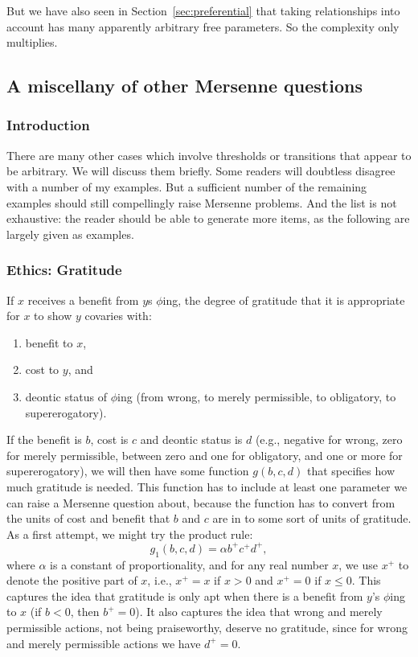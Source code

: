But we have also seen in Section~\ref{sec:preferential} that taking relationships into account has many apparently arbitrary free parameters. So 
the complexity only multiplies.


\subsection{A miscellany of other Mersenne questions}
\subsubsection{Introduction}
There are many other cases which involve thresholds or transitions that appear to be arbitrary. We will discuss them briefly.
Some readers will doubtless disagree with a number of my examples. But a sufficient number of the remaining examples 
should still compellingly raise Mersenne problems. And the list is not
exhaustive: the reader should be able to generate more items, as the following are largely given as examples.

\subsubsection{Ethics: Gratitude}
If $x$ receives a benefit from $y$s $\phi$ing, the degree of gratitude that it is
appropriate for $x$ to show $y$ covaries with:
\begin{enumerate}
\item[(i)] benefit to $x$,
\item[(ii)] cost to $y$, and
\item[(iii)] deontic status of $\phi$ing (from wrong, to merely permissible, to obligatory, to supererogatory).
\end{enumerate}

If the benefit is $b$, cost is $c$ and deontic status is $d$ (e.g., negative for wrong, zero for merely
permissible, between zero and one for obligatory, and one or more for supererogatory), we will then have 
some function $g(b,c,d)$ that specifies how much gratitude is needed. This function has to include at least
one parameter we can raise a Mersenne question about, because the function has to convert from the units
of cost and benefit that $b$ and $c$ are in to some sort of units of gratitude. As a first
attempt, we might try the product rule:
$$
	g_1(b,c,d)=\alpha b^+ c^+ d^+,
$$	
where $\alpha$ is a constant of proportionality, and for any real
number $x$, we use $x^+$ to denote the positive part of $x$, i.e., $x^+=x$ if $x>0$ and $x^+=0$ if $x\le 0$.
This captures the idea that gratitude is only apt when there is a benefit from $y$'s $\phi$ing to $x$ (if $b<0$, 
then $b^+=0$). It also captures the idea that wrong and merely permissible actions, not being praiseworthy,
deserve no gratitude, since for wrong and merely permissible actions we have $d^+=0$.

